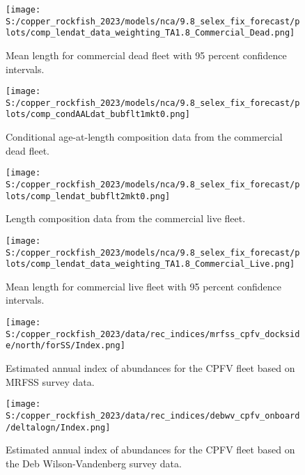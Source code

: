 \documentclass[11pt,
  english,
  letterpaper,
]{article}
\begin{document}
\pagebreak

\begin{figure}
\centering
\texttt{[image: S:/copper\_rockfish\_2023/models/nca/9.8\_selex\_fix\_forecast/plots/comp\_lendat\_data\_weighting\_TA1.8\_Commercial\_Dead.png]}
\caption{Mean length for commercial dead fleet with 95 percent confidence intervals.\label{fig:mean-com-dead-len-data}}
\end{figure}

\pagebreak

\begin{figure}
\centering
\texttt{[image: S:/copper\_rockfish\_2023/models/nca/9.8\_selex\_fix\_forecast/plots/comp\_condAALdat\_bubflt1mkt0.png]}
\caption{Conditional age-at-length composition data from the commercial dead fleet.\label{fig:com-dead-age-data}}
\end{figure}

\pagebreak

\begin{figure}
\centering
\texttt{[image: S:/copper\_rockfish\_2023/models/nca/9.8\_selex\_fix\_forecast/plots/comp\_lendat\_bubflt2mkt0.png]}
\caption{Length composition data from the commercial live fleet.\label{fig:com-live-len-data}}
\end{figure}

\pagebreak

\begin{figure}
\centering
\texttt{[image: S:/copper\_rockfish\_2023/models/nca/9.8\_selex\_fix\_forecast/plots/comp\_lendat\_data\_weighting\_TA1.8\_Commercial\_Live.png]}
\caption{Mean length for commercial live fleet with 95 percent confidence intervals.\label{fig:mean-com-live-len-data}}
\end{figure}

\pagebreak

\begin{figure}
\centering
\texttt{[image: S:/copper\_rockfish\_2023/data/rec\_indices/mrfss\_cpfv\_dockside/north/forSS/Index.png]}
\caption{Estimated annual index of abundances for the CPFV fleet based on MRFSS survey data.\label{fig:mrfss-index-main}}
\end{figure}

\pagebreak

\begin{figure}
\centering
\texttt{[image: S:/copper\_rockfish\_2023/data/rec\_indices/debwv\_cpfv\_onboard/deltalogn/Index.png]}
\caption{Estimated annual index of abundances for the CPFV fleet based on the Deb Wilson-Vandenberg survey data.\label{fig:dwv-index-main}}
\end{figure}
\end{document}
